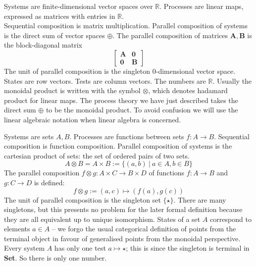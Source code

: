 \begin{example}
Systems are finite-dimensional vector spaces over $\mathbb{R}$. Processes are linear maps, expressed as matrices with entries in $\mathbb{R}$.\\
Sequential composition is matrix multiplication. Parallel composition of systems is the direct sum of vector spaces $\oplus$. The parallel composition of matrices $\mathbf{A}, \mathbf{B}$ is the block-diagonal matrix
$$\begin{bmatrix}
\mathbf{A} & \mathbf{0} \\
\mathbf{0} & \mathbf{B}
\end{bmatrix}$$
The unit of parallel composition is the singleton 0-dimensional vector space.
States are row vectors. Tests are column vectors. The numbers are $\mathbb{R}$. Usually the monoidal product is written with the symbol $\otimes$, which denotes hadamard product for linear maps. The process theory we have just described takes the direct sum $\oplus$ to be the monoidal product. To avoid confusion we will use the linear algebraic notation when linear algebra is concerned.
\end{example}

\begin{example}
Systems are sets $A,B$. Processes are functions between sets $f: A \rightarrow B$. Sequential composition is function composition. Parallel composition of systems is the cartesian product of sets: the set of ordered pairs of two sets.
\[A \otimes B = A \times B := \{(a,b) \ | \ a \in A, b \in B\}\]
The parallel composition $f \otimes g : A \times C \rightarrow B \times D$ of functions $f: A \rightarrow B$ and $g: C \rightarrow D$ is defined:
\[f \otimes g := (a,c) \mapsto (f(a),g(c))\]
The unit of parallel composition is the singleton set $\{\star\}$. There are many singletons, but this presents no problem for the later formal definition because they are all equivalent up to unique isomorphism. States of a set $A$ correspond to elements $a \in A$ --  we forgo the usual categorical definition of points from the terminal object in favour of generalised points from the monoidal perspective. Every system $A$ has only one test $a \mapsto \star$; this is since the singleton is terminal in \textbf{Set}. So there is only one number.
\end{example}

